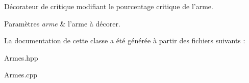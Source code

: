 Décorateur de critique modifiant le pourcentage critique de l'arme. 


\begin{DoxyParams}{Paramètres}
{\em arme} & l'arme à décorer. \\
\hline
\end{DoxyParams}


La documentation de cette classe a été générée à partir des fichiers suivants \-:\begin{DoxyCompactItemize}
\item 
Armes.\-hpp\item 
Armes.\-cpp\end{DoxyCompactItemize}
